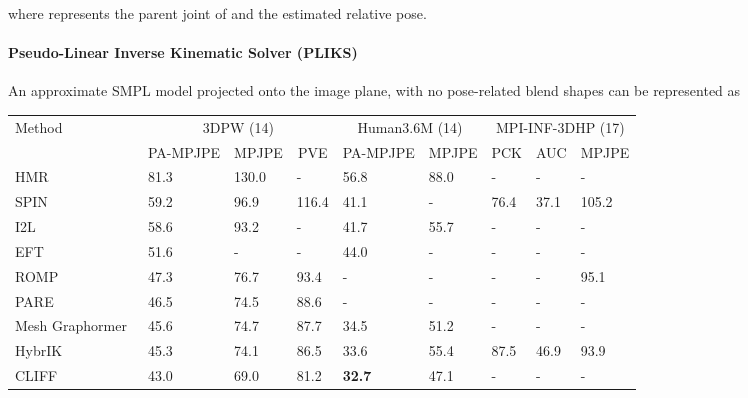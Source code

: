 \documentclass[10pt,twocolumn,letterpaper]{article}
\newcommand{\myrowcolour}{\rowcolor[gray]{0.925}}
\begin{document}
where  represents the parent joint of  and  the estimated relative pose. 


\paragraph{Pseudo-Linear Inverse Kinematic Solver (PLIKS)}
An approximate SMPL model projected onto the image plane, with no pose-related blend shapes can be represented as




\begin{table*}[ht]
\centering
\footnotesize
\begin{tabular}{l|llllllll}
\multirow{2}{*}{Method} & \multicolumn{3}{c}{3DPW (14)}                          & \multicolumn{2}{c}{Human3.6M (14)}     & \multicolumn{3}{c}{MPI-INF-3DHP (17)} \\ \cline{2-9} 
 &
  \multicolumn{1}{c}{PA-MPJPE} &
  \multicolumn{1}{c}{MPJPE} &
  \multicolumn{1}{c|}{PVE} &
  \multicolumn{1}{c}{PA-MPJPE} &
  \multicolumn{1}{c|}{MPJPE} &
  \multicolumn{1}{c}{PCK} &
  \multicolumn{1}{c}{AUC} &
  \multicolumn{1}{c}{MPJPE} \\ \hline
HMR~\cite{hmr}                     & 81.3 & 130.0 & \multicolumn{1}{l|}{-}             & 56.8 & \multicolumn{1}{l|}{88.0} & -              & -   & -              \\\myrowcolour
SPIN~\cite{spin}                    & 59.2 & 96.9  & \multicolumn{1}{l|}{116.4}         & 41.1 & \multicolumn{1}{l|}{-}    & 76.4          & 37.1     & 105.2      \\
I2L~\cite{i2l}        & 58.6 & 93.2  & \multicolumn{1}{l|}{-}             & 41.7 & \multicolumn{1}{l|}{55.7} & -              & -    & -            \\\myrowcolour
EFT~\cite{eft}                    & 51.6 & -     & \multicolumn{1}{l|}{-}             & 44.0 & \multicolumn{1}{l|}{-}    & -           & -       & -         \\
ROMP~\cite{romp}                   & 47.3 & 76.7  & \multicolumn{1}{l|}{93.4}          & -    & \multicolumn{1}{l|}{-}    & - & -               & 95.1               \\\myrowcolour

PARE~\cite{pare}                   & 46.5 & 74.5  & \multicolumn{1}{l|}{88.6}          & -    & \multicolumn{1}{l|}{-}    & -              & -    & -            \\
Mesh Graphormer~\cite{meshgraph}         & 45.6 & 74.7  & \multicolumn{1}{l|}{87.7}          & 34.5 & \multicolumn{1}{l|}{51.2} & -              & -   & -             \\\myrowcolour
HybrIK~\cite{hybrik}                 & 45.3 & 74.1  & \multicolumn{1}{l|}{86.5} & 33.6 & \multicolumn{1}{l|}{55.4} & 87.5     & 46.9         & 93.9         \\ 
CLIFF~\cite{cliff}                 & 43.0 & 69.0  & \multicolumn{1}{l|}{81.2} & \textbf{32.7} & \multicolumn{1}{l|}{47.1} & -     & -         & -            \\ \hline 




\end{tabular}
\end{table*}
\end{document}
